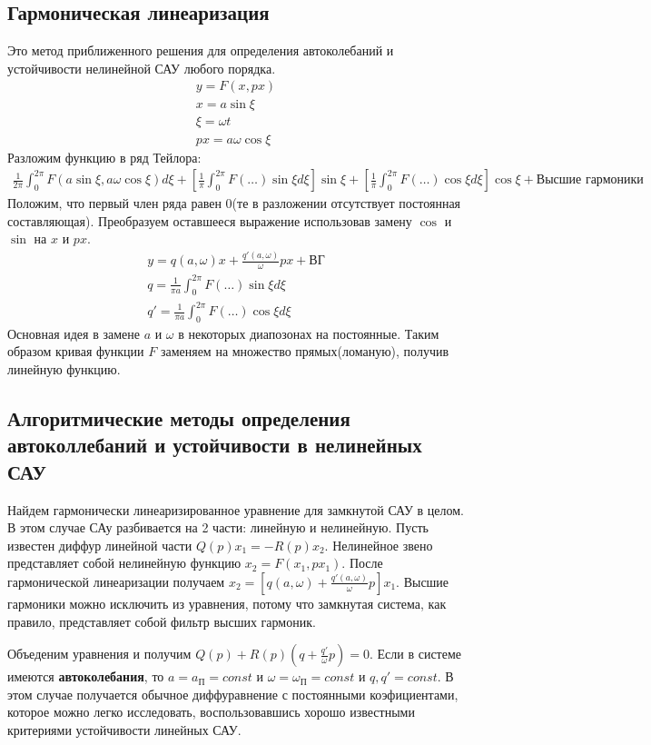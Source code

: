 \subsection{Гармоническая линеаризация}
Это метод приближенного решения для определения автоколебаний и устойчивости нелинейной САУ любого порядка.
\begin{align*}
	y = F(x, px) \\
	x = a\sin\xi \\ 
	\xi = \omega{}t\\
	px = a\omega\cos\xi
\end{align*}
Разложим функцию в ряд Тейлора:
\begin{align*}
	\frac1{2\pi}\int^{2\pi}_0F(a\sin\xi,a\omega\cos\xi)d\xi+[\frac1{\pi}\int^{2\pi}_0F(\ldots)\sin\xi{}d\xi]\sin\xi +[\frac1{\pi}\int^{2\pi}_0F(\ldots)\cos\xi{}d\xi]\cos\xi + \text{Высшие гармоники}
\end{align*}
Положим, что первый член ряда равен 0(те в разложении отсутствует постоянная составляющая). Преобразуем оставшееся выражение использовав замену $\cos$ и $\sin$ на $x$ и $px$.
\begin{align*}
	y=q(a,\omega)x+\frac{q'(a,\omega)}{\omega}px+ \text{ВГ} \\
	q=\frac1{\pi{}a}\int^{2\pi}_0F(\ldots)\sin\xi{}d\xi \\
	q'=\frac1{\pi{}a}\int^{2\pi}_0F(\ldots)\cos\xi{}d\xi
\end{align*}
Основная идея в замене $a$ и $\omega$ в некоторых диапозонах на постоянные. Таким образом кривая функции $F$ заменяем на множество прямых(ломаную), получив линейную функцию.

\subsection{Алгоритмические методы определения автоколлебаний и устойчивости в нелинейных САУ}
Найдем гармонически линеаризированное уравнение для замкнутой САУ в целом. В этом случае САу разбивается на 2 части: линейную и нелинейную. Пусть известен диффур линейной части $Q(p)x_1=-R(p)x_2$. Нелинейное звено представляет собой нелинейную функцию $x_2=F(x_1,px_1)$. После гармонической линеаризации получаем $x_2=[q(a,\omega)+\frac{q'(a,\omega)}{\omega}p]x_1$. Высшие гармоники можно исключить из уравнения, потому что замкнутая система, как правило, представляет собой фильтр высших гармоник.

Объеденим уравнения и получим $Q(p)+R(p)(q+\frac{q'}{\omega}p)=0$. Если в системе имеются \textbf{автоколебания}, то $a=a_{\text{П}}=const$ и $\omega=\omega_{\text{П}}=const$ и $q,q'=const$. В этом случае получается обычное диффуравнение с постоянными коэфициентами, которое можно легко исследовать, воспользовавшись хорошо известными критериями устойчивости линейных САУ.
